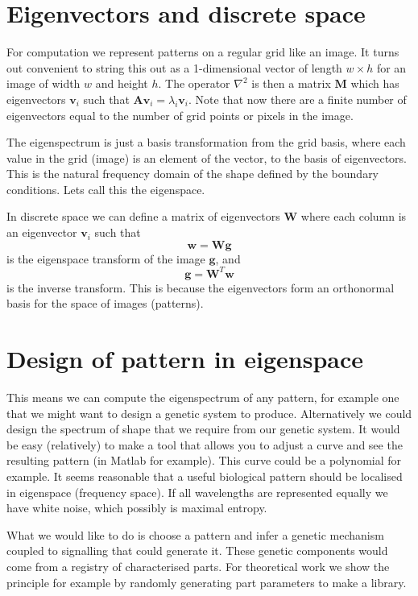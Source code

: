 \documentclass{report}
\renewcommand{\vec}[1]{\mathbf{#1}}
\newcommand{\mat}{\mathbf}
\begin{document}
\section{Eigenvectors and discrete space}
For computation we represent patterns on a regular grid like an image. It turns
out convenient to string this out as a 1-dimensional vector of length $w\times
h$ for an image of width $w$ and height $h$. The operator $\nabla^2$ is then a
matrix $\mat{M}$ which has eigenvectors $\vec{v}_i$ such that $\mat{A}\vec{v}_i
= \lambda_i \vec{v}_i$. Note that now there are a finite number of eigenvectors
equal to the number of grid points or pixels in the image.

The eigenspectrum is just a basis transformation from the grid basis, where each
value in the grid (image) is an element of the vector, to the basis of
eigenvectors. This is the natural frequency domain of the shape defined by the
boundary conditions. Lets call this the eigenspace.

In discrete space we can define a matrix of eigenvectors
$\mat{W}$ where each column is an eigenvector $\vec{v}_i$ such that
\begin{equation}
\vec{w} = \mat{W}\vec{g}
\end{equation}
is the eigenspace transform of the image $\vec{g}$, and
\begin{equation}
\vec{g} = \mat{W}^T\vec{w}
\end{equation}
is the inverse transform. This is because the eigenvectors form an orthonormal
basis for the space of images (patterns).

\section{Design of pattern in eigenspace}
This means we can compute the eigenspectrum of any pattern, for example one that
we might want to design a genetic system to produce. Alternatively we could
design the spectrum of shape that we require from our genetic system. It would
be easy (relatively) to make a tool that allows you to adjust a curve and see
the resulting pattern (in Matlab for example). This curve could be a polynomial
for example. It seems reasonable that a useful biological pattern should be
localised in eigenspace (frequency space). If all wavelengths are represented
equally we have white noise, which possibly is maximal entropy. 

What we would like to do is choose a pattern and infer a genetic mechanism
coupled to signalling that could generate it. These genetic components would
come from a registry of characterised parts. For theoretical work we show the
principle for example by randomly generating part parameters to make a library.
\end{document}
